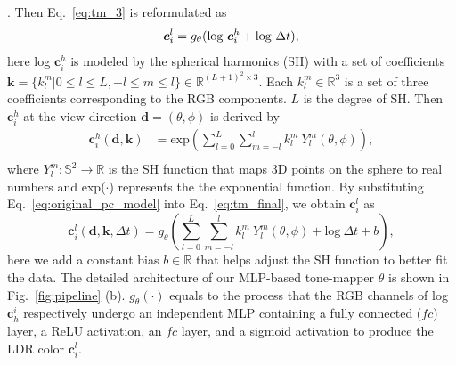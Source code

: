 \documentclass{article}
\begin{document}
. Then Eq.~\eqref{eq:tm_3} is reformulated as
\vspace{0.3mm}
\begin{equation}
    \bm{c}_i^l = g_{\theta}(\text{log}~\bm{c}_i^h + \text{log}~\Delta t),
    \label{eq:tm_final}
\vspace{0.3mm}
\end{equation}
here log $\bm{c}_i^h$ is modeled by the spherical harmonics (SH) with a set of coefficients $\mathbf{k} = \{k_l^m | 0 \leq l \leq L, -l \leq m \leq l\} \in \mathbb{R}^{(L+1)^2\times 3}$. Each $k_l^m \in \mathbb{R}^{3}$ is a set of three coefficients corresponding to the RGB components. $L$ is the degree of SH. Then $\bm{c}_i^h$ at the view direction $\mathbf{d} = (\theta, \phi)$ is derived by
\begin{equation}
\begin{aligned}
    \bm{c}_i^h (\mathbf{d}, \mathbf{k}) &= \text{exp}(\sum_{l  = 0}^{L} \sum_{m = -l}^{l} k_l^m~Y_l^m(\theta, \phi)), \\
\end{aligned}
\label{eq:original_pc_model}
\end{equation}
where  $Y_l^m: \mathbb{S}^2 \rightarrow \mathbb{R}$ is the SH function that maps 3D points on the sphere to real numbers and exp($\cdot$) represents the  the exponential function. By substituting Eq.~\eqref{eq:original_pc_model} into Eq.~\eqref{eq:tm_final}, we obtain $\bm{c}_i^l$ as
\begin{equation}
    \bm{c}_i^l (\mathbf{d}, \mathbf{k}, \Delta t) = g_{\theta}(\sum_{l  = 0}^{L} \sum_{m = -l}^{l} k_l^m~Y_l^m(\theta, \phi) + \text{log}~\Delta t + b),
    \label{eq:ldr_final}
\end{equation}
here we add a constant bias $b \in \mathbb{R}$ that helps adjust the SH function to better fit the data. The detailed architecture of our MLP-based tone-mapper $\theta$ is shown in Fig.~\ref{fig:pipeline} (b). $g_{\theta}(\cdot)$ equals to the process that the RGB channels of log $\bm{c}^i_h$ respectively undergo an independent MLP containing a fully connected ($fc$) layer, a ReLU activation, an $fc$ layer, and a sigmoid activation to produce the LDR color $\bm{c}_i^l$.
\end{document}
